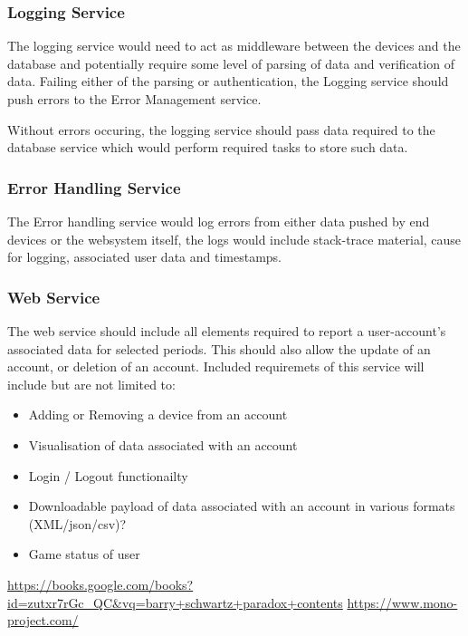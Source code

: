 \documentclass{article}
\begin{document}
            \subsubsection{Logging Service}
            The logging service would need to act as middleware between the devices and the database and 
            potentially require some level of parsing of data and verification of data. Failing either of the
            parsing or authentication, the Logging service should push errors to the Error Management service.
            \par
            Without errors occuring, the logging service should pass data required to the database service which
            would perform required tasks to store such data.

            \subsubsection{Error Handling Service}
            The Error handling service would log errors from either data pushed by end devices or the websystem itself,
            the logs would include stack-trace material, cause for logging, associated user data and timestamps.

            \subsubsection{Web Service}
            The web service should include all elements required to report a user-account's associated data
            for selected periods. This should also allow the update of an account, or deletion of an account.
            Included requiremets of this service will include but are not limited to:
            \begin{itemize}
                \item Adding or Removing a device from an account
                \item Visualisation of data associated with an account
                \item Login / Logout functionailty
                \item Downloadable payload of data associated with an account in various formats (XML/json/csv)?
                \item Game status of user
            \end{itemize}
            
    \begin{thebibliography}
        \raggedright
            \url{https://books.google.com/books?id=zutxr7rGc_QC&vq=barry+schwartz+paradox+contents}
            \url{https://www.mono-project.com/}
    \end{thebibliography}

    
\end{document}
